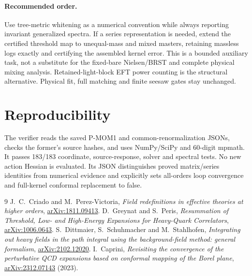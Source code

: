 \documentclass[11pt]{article}
\begin{document}
\paragraph{Recommended order.}
Use tree-metric whitening as a numerical convention while always
reporting invariant generalized spectra. If a series representation is
needed, extend the certified threshold map to unequal-mass and mixed
masters, retaining massless logs exactly and certifying the assembled
kernel error. This is a bounded auxiliary task, not a substitute for
the fixed-bare Nielsen/BRST and complete physical mixing analysis.
Retained-light-block EFT power counting is the structural alternative.
Physical fit, full matching and finite seesaw gates stay unchanged.

\section{Reproducibility}
The verifier 
reads the saved P-MOM1 and common-renormalization JSONs, checks the former's
source hashes, and uses NumPy/SciPy and 60-digit mpmath. It passes
183/183 coordinate, source-response, solver and spectral tests.
No new action Hessian is evaluated. Its JSON distinguishes proved
matrix/series identities from numerical evidence and explicitly sets
all-orders loop convergence and full-kernel conformal replacement to false.

\clearpage
\begin{thebibliography}{9}
J.~C.~Criado and M.~Perez-Victoria,
\emph{Field redefinitions in effective theories at higher orders},
\href{https://arxiv.org/abs/1811.09413}{arXiv:1811.09413}.
D.~Greynat and S.~Peris,
\emph{Resummation of Threshold, Low- and High-Energy Expansions for
Heavy-Quark Correlators},
\href{https://arxiv.org/abs/1006.0643}{arXiv:1006.0643}.
S.~Dittmaier, S.~Schuhmacher and M.~Stahlhofen,
\emph{Integrating out heavy fields in the path integral using the
background-field method: general formalism},
\href{https://arxiv.org/abs/2102.12020}{arXiv:2102.12020}.
I.~Caprini, \emph{Revisiting the convergence of the perturbative QCD
expansions based on conformal mapping of the Borel plane},
\href{https://arxiv.org/abs/2312.07143}{arXiv:2312.07143} (2023).
\end{thebibliography}
\end{document}
